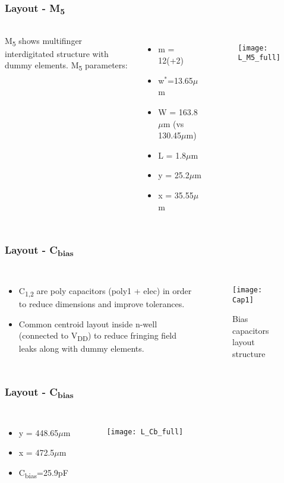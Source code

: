 \begin{frame}
	\frametitle{Layout - M\textsubscript{5}}
	\begin{columns}
		M\textsubscript{5} shows multifinger interdigitated structure with dummy 	elements. M\textsubscript{5} parameters:
		\begin{itemize}
			\item m = 12(+2)
			\item w$^*$=13.65$\mu$m
			\item W = 163.8$\mu$m (vs 130.45$\mu$m)
			\item L = 1.8$\mu$m
			\item y = 25.2$\mu$m
			\item x = 35.55$\mu$m
		\end{itemize}
		\begin{figure}[H]
			\centering
			\texttt{[image: L\_M5\_full]}
			\label{L_M5_full}
		\end{figure}
	\end{columns}
\end{frame}

\begin{frame}
\frametitle{Layout - C\textsubscript{bias}}
\begin{columns}
	\column{0.6\textwidth}
	\begin{itemize}
		\item C\textsubscript{1,2} are poly capacitors (poly1 + elec) in order to reduce dimensions and improve tolerances. 
		\item Common centroid layout inside n-well (connected to V\textsubscript{DD}) to reduce fringing field leaks along with dummy elements.
	\end{itemize}
	\column{0.4\textwidth}
	\begin{figure}[H]
		\centering
		\texttt{[image: Cap1]}
		\caption{Bias capacitors layout structure}
		\label{Cap1}
	\end{figure}
\end{columns}
\end{frame}

\begin{frame}
\frametitle{Layout - C\textsubscript{bias}}
\begin{columns}
	\column{0.4\textwidth}
	\begin{itemize}
		\item y = 448.65$\mu$m
		\item x = 472.5$\mu$m
		\item C\textsubscript{bias}=25.9pF
	\end{itemize}
	\begin{figure}[H]
		\centering
		\texttt{[image: L\_Cb\_full]}
		\label{L_Cb_full}
	\end{figure}
\end{columns}
\end{frame}

